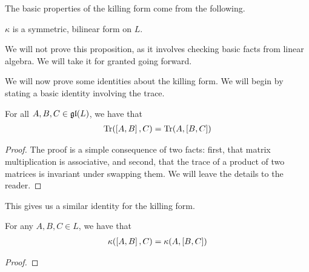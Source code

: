 The basic properties of the killing form come from the following.

\begin{boxproposition}
    $\kappa$ is a symmetric, bilinear form on $L$.
\end{boxproposition}

We will not prove this proposition, as it involves checking basic facts from linear algebra. We will take it for granted going forward.

\begin{comment}
Recall that we can assocate to any symmetric, bilinear form a symmetric matrix of it applied to any basis of a vector space. Denote
\begin{align}
    B := \begin{bmatrix}
        \kof{e_1, e_1} & \cdots & \kof{e_1, e_n} \\
        \vdots & \ddots & \vdots \\
        \kof{e_n, e_1} & \cdots & \kof{e_n, e_n}
    \end{bmatrix}
\end{align}
where $\set{e_1, \ldots, e_n}$ is a basis of $L$ and $n$ is its $\C$-dimension. Indeed, we can diagonalise $B$ by orthogonalising $\set{e_1, \ldots, e_n}$ with respect to $\kappa$ using the Gram-Schmidt process. Therefore, we may assume, without loss of generality, that $B$ is diagonal.
\end{comment}

We will now prove some identities about the killing form. We will begin by stating a basic identity involving the trace.

\begin{boxlemma}\label{Ch2:Lemma:TraceAssoc}
    For all $A, B, C \in \mathfrak{gl}\!\left( L \right)$, we have that
    \begin{align}
        \operatorname{Tr}\!\left( \left[ A, B \right], C \right) = \operatorname{Tr}\!\left( A, \left[ B, C \right] \right)
        \label{Ch2:Eq:TraceAssoc}
    \end{align}
\end{boxlemma}
\begin{proof}
    The proof is a simple consequence of two facts: first, that matrix multiplication is associative, and second, that the trace of a product of two matrices is invariant under swapping them. We will leave the details to the reader.
\end{proof}

This gives us a similar identity for the killing form.
\begin{boxcorollary}\label{Ch2:Cor:KillingAssoc}
    For any $A, B, C \in L$, we have that
    \begin{align}
        \kappa\!\left( \left[ A, B \right], C \right) = \kappa\!\left( A, \left[ B, C \right] \right)
        \label{Ch2:Eq:KillingAssoc}
    \end{align}
\end{boxcorollary}
\begin{proof}

    \sorry  %
\end{proof}

